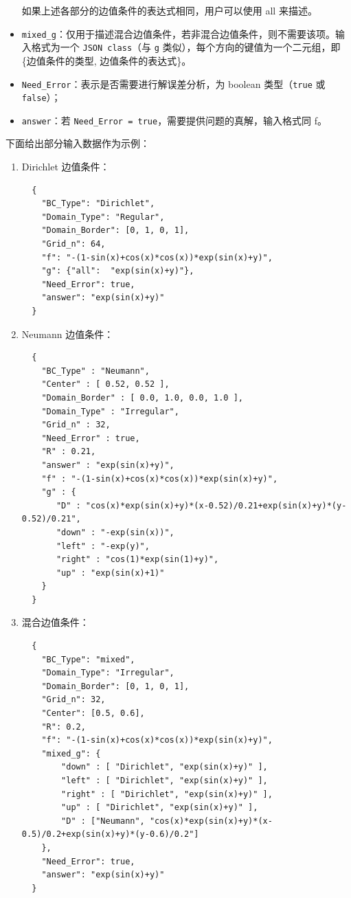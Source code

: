 \documentclass[lang=cn,a4paper,newtx,bibend=bibtex]{elegantpaper}
\begin{document}
\begin{itemize}
\begin{itemize}[$\circ$]
                       \end{itemize}
                       如果上述各部分的边值条件的表达式相同，用户可以使用 all 来描述。
  \item \lstinline{mixed_g}：仅用于描述混合边值条件，若非混合边值条件，则不需要该项。输入格式为一个 \texttt{JSON class}（与 \texttt{g} 类似），每个方向的键值为一个二元组，即 \{边值条件的类型, 边值条件的表达式\}。
  \item \lstinline{Need_Error}：表示是否需要进行解误差分析，为 boolean 类型（\texttt{true} 或 \texttt{false}）；
  \item \lstinline{answer}：若 \texttt{Need\_Error = true}，需要提供问题的真解，输入格式同 f。
\end{itemize}

下面给出部分输入数据作为示例：
\begin{enumerate}
\item Dirichlet 边值条件：
\begin{lstlisting}
  {
    "BC_Type": "Dirichlet",
    "Domain_Type": "Regular",
    "Domain_Border": [0, 1, 0, 1],
    "Grid_n": 64,
    "f": "-(1-sin(x)+cos(x)*cos(x))*exp(sin(x)+y)",
    "g": {"all":  "exp(sin(x)+y)"},
    "Need_Error": true,
    "answer": "exp(sin(x)+y)"
  }
\end{lstlisting}

\item Neumann 边值条件：
\begin{lstlisting}
  {
    "BC_Type" : "Neumann",
    "Center" : [ 0.52, 0.52 ],
    "Domain_Border" : [ 0.0, 1.0, 0.0, 1.0 ],
    "Domain_Type" : "Irregular",
    "Grid_n" : 32,
    "Need_Error" : true,
    "R" : 0.21,
    "answer" : "exp(sin(x)+y)",
    "f" : "-(1-sin(x)+cos(x)*cos(x))*exp(sin(x)+y)",
    "g" : {
       "D" : "cos(x)*exp(sin(x)+y)*(x-0.52)/0.21+exp(sin(x)+y)*(y-0.52)/0.21",
       "down" : "-exp(sin(x))",
       "left" : "-exp(y)",
       "right" : "cos(1)*exp(sin(1)+y)",
       "up" : "exp(sin(x)+1)"
    }
  }
\end{lstlisting}

\item 混合边值条件：
\begin{lstlisting}
  {
    "BC_Type": "mixed",
    "Domain_Type": "Irregular",
    "Domain_Border": [0, 1, 0, 1],
    "Grid_n": 32,
    "Center": [0.5, 0.6],
    "R": 0.2,
    "f": "-(1-sin(x)+cos(x)*cos(x))*exp(sin(x)+y)",
    "mixed_g": {
        "down" : [ "Dirichlet", "exp(sin(x)+y)" ],
        "left" : [ "Dirichlet", "exp(sin(x)+y)" ],
        "right" : [ "Dirichlet", "exp(sin(x)+y)" ],
        "up" : [ "Dirichlet", "exp(sin(x)+y)" ],
        "D" : ["Neumann", "cos(x)*exp(sin(x)+y)*(x-0.5)/0.2+exp(sin(x)+y)*(y-0.6)/0.2"]
    },
    "Need_Error": true,
    "answer": "exp(sin(x)+y)"
  }
\end{lstlisting}
\end{enumerate}
\end{document}
